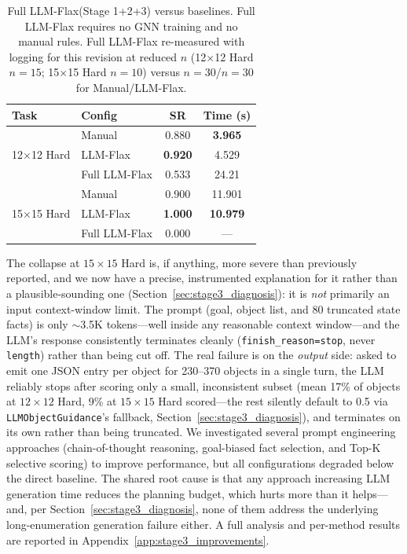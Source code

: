 \documentclass[letterpaper, 10pt, journal, twoside]{IEEEtran}
\newcommand{\sref}[1]{Section~\ref{#1}}
\newcommand{\method}{LLM-Flax\xspace}
\newcommand{\fullmethod}{Full LLM-Flax\xspace}
\begin{document}
\begin{table}[h]
    \centering
    \caption{\fullmethod (Stage 1+2+3) versus baselines. Full LLM-Flax requires no GNN training and no manual rules. \fullmethod re-measured with logging for this revision at reduced $n$ (12$\times$12 Hard $n{=}15$; 15$\times$15 Hard $n{=}10$) versus $n{=}30$/$n{=}30$ for Manual/\method.}
    \label{tab:stage3}
    \small
    \setlength{\tabcolsep}{4pt}
    \renewcommand{\arraystretch}{1.1}
    \begin{tabular}{llcc}
        \toprule
        \textbf{Task} & \textbf{Config} & \textbf{SR} & \textbf{Time (s)} \\
        \midrule
        \multirow{3}{*}{12$\times$12 Hard}
            & Manual              & 0.880          & \textbf{3.965} \\
            & \method             & \textbf{0.920} & 4.529 \\
            & \fullmethod         & 0.533          & 24.21 \\
        \midrule
        \multirow{3}{*}{15$\times$15 Hard}
            & Manual              & 0.900          & 11.901 \\
            & \method             & \textbf{1.000} & \textbf{10.979} \\
            & \fullmethod         & 0.000          & --- \\
        \bottomrule
    \end{tabular}
\end{table}

The collapse at $15{\times}15$ Hard is, if anything, more severe than previously reported, and we now have a precise, instrumented explanation for it rather than a plausible-sounding one (\sref{sec:stage3_diagnosis}): it is \emph{not} primarily an input context-window limit.
The prompt (goal, object list, and 80 truncated state facts) is only $\sim$3.5K tokens---well inside any reasonable context window---and the LLM's response consistently terminates cleanly (\texttt{finish\_reason=stop}, never \texttt{length}) rather than being cut off.
The real failure is on the \emph{output} side: asked to emit one JSON entry per object for 230--370 objects in a single turn, the LLM reliably stops after scoring only a small, inconsistent subset (mean 17\% of objects at $12{\times}12$ Hard, 9\% at $15{\times}15$ Hard scored---the rest silently default to 0.5 via \texttt{LLMObjectGuidance}'s fallback, \sref{sec:stage3_diagnosis}), and terminates on its own rather than being truncated.
We investigated several prompt engineering approaches (chain-of-thought reasoning, goal-biased fact selection, and Top-K selective scoring) to improve performance, but all configurations degraded below the direct baseline.
The shared root cause is that any approach increasing LLM generation time reduces the planning budget, which hurts more than it helps---and, per \sref{sec:stage3_diagnosis}, none of them address the underlying long-enumeration generation failure either.
A full analysis and per-method results are reported in Appendix~\ref{app:stage3_improvements}.
\end{document}
